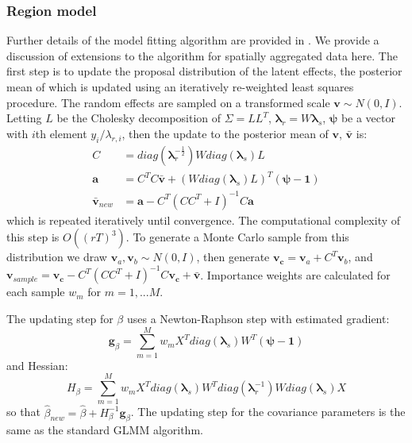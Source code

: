\subsubsection{Region model}
Further details of the model fitting algorithm are provided in \citet{Watson2026}. We provide a discussion of extensions to the algorithm for spatially aggregated data here. The first step is to update the proposal distribution of the latent effects, the posterior mean of which is updated using an iteratively re-weighted least squares procedure. The random effects are sampled on a transformed scale $\boldsymbol{v}\sim N(0,I)$. Letting $L$ be the Cholesky decomposition of $\Sigma = LL^T$, $\boldsymbol{\lambda}_r = W \boldsymbol{\lambda}_s$, $\boldsymbol{\psi}$ be a vector with $i$th element $y_i/\lambda_{r,i}$, then the update to the posterior mean of $\boldsymbol{v}$, $\bar{\boldsymbol{v}}$ is:
\begin{align*}
C &= diag(\boldsymbol{\lambda}_r^{-\frac{1}{2}}) Wdiag(\boldsymbol{\lambda}_s)L\\
\boldsymbol{a} &= C^TC \bar{\boldsymbol{v}} + (Wdiag(\boldsymbol{\lambda}_s)L)^T(\boldsymbol{\psi}- \mathbf{1})\\
    \bar{\boldsymbol{v}}_{new} &= \boldsymbol{a}- C^T(CC^T+I)^{-1}C \boldsymbol{a} 
\end{align*}
which is repeated iteratively until convergence. The computational complexity of this step is $O((rT)^3)$. To generate a Monte Carlo sample from this distribution we draw $\mathbf{v}_a,\mathbf{v}_b \sim N(0,I)$, then generate $\mathbf{v_c} = \mathbf{v}_a + C^T \mathbf{v}_b$, and $\mathbf{v}_{sample} = \mathbf{v_c} - C^T (CC^T + I)^{-1}C\mathbf{v_c} + \bar{\boldsymbol{v}}$. Importance weights are calculated for each sample $w_m$ for $m = 1,...M$.

The updating step for $\beta$ uses a Newton-Raphson step with estimated gradient:
\begin{equation*}
    \boldsymbol{g}_\beta = \sum_{m=1}^M w_m X^T diag(\boldsymbol{\lambda}_s) W^T (\boldsymbol{\psi} - \mathbf{1})
\end{equation*}
and Hessian:
\begin{equation}
\label{eq:hessb}
    H_\beta = \sum_{m=1}^M w_m X^T diag(\boldsymbol{\lambda}_s) W^T diag(\boldsymbol{\lambda}_r
^{-1})W diag(\boldsymbol{\lambda}_s) X
\end{equation}
so that $\hat{\beta}_{new} = \hat{\beta} + H_\beta^{-1}\boldsymbol{g}_\beta$. The updating step for the covariance parameters is the same as the standard GLMM algorithm.

